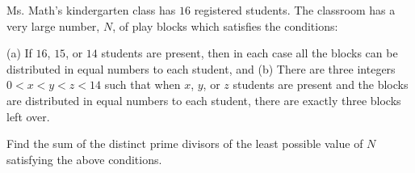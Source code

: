 Ms. Math's kindergarten class has $16$ registered students. The classroom has a very large number, $N$, of play blocks which satisfies the conditions:

(a) If $16$, $15$, or $14$ students are present, then in each case all the blocks can be distributed in equal numbers to each student, and
(b) There are three integers $0 < x < y < z < 14$ such that when $x$, $y$, or $z$ students are present and the blocks are distributed in equal numbers to each student, there are exactly three blocks left over.

Find the sum of the distinct prime divisors of the least possible value of $N$ satisfying the above conditions.